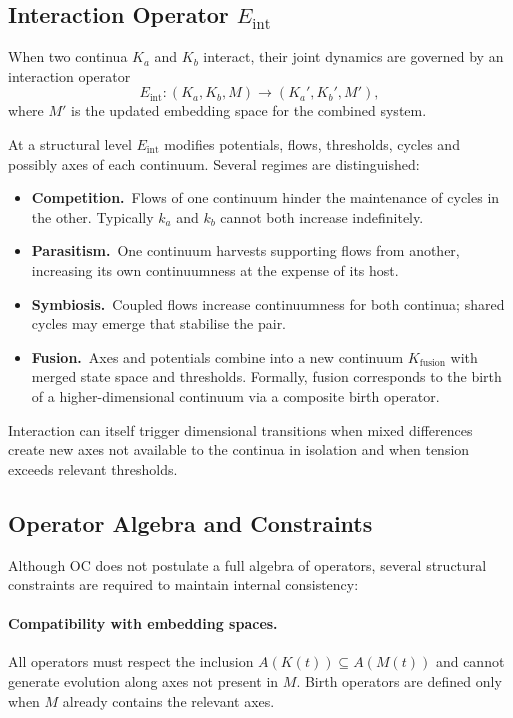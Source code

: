 \subsection{Interaction Operator \texorpdfstring{$E_{\mathrm{int}}$}{E\_int}}

When two continua \(K_a\) and \(K_b\) interact, their joint dynamics are
governed by an interaction operator
\[
  E_{\mathrm{int}} : (K_a, K_b, M)
    \longrightarrow (K_a', K_b', M'),
\]
where \(M'\) is the updated embedding space for the combined system.

At a structural level \(E_{\mathrm{int}}\) modifies potentials, flows,
thresholds, cycles and possibly axes of each continuum. Several regimes are
distinguished:

\begin{itemize}
  \item \textbf{Competition.}\ 
        Flows of one continuum hinder the maintenance of cycles in the other.
        Typically \(k_a\) and \(k_b\) cannot both increase indefinitely.
  \item \textbf{Parasitism.}\ 
        One continuum harvests supporting flows from another, increasing its
        own continuumness at the expense of its host.
  \item \textbf{Symbiosis.}\ 
        Coupled flows increase continuumness for both continua; shared cycles
        may emerge that stabilise the pair.
  \item \textbf{Fusion.}\ 
        Axes and potentials combine into a new continuum
        \(K_{\mathrm{fusion}}\) with merged state space and thresholds.
        Formally, fusion corresponds to the birth of a higher-dimensional
        continuum via a composite birth operator.
\end{itemize}

Interaction can itself trigger dimensional transitions when mixed differences
create new axes not available to the continua in isolation and when tension
exceeds relevant thresholds.

\subsection{Operator Algebra and Constraints}

Although OC does not postulate a full algebra of operators, several structural
constraints are required to maintain internal consistency:

\paragraph{Compatibility with embedding spaces.}
All operators must respect the inclusion
\(A(K(t)) \subseteq A(M(t))\) and cannot generate evolution along axes not
present in \(M\). Birth operators are defined only when \(M\) already contains
the relevant axes.

